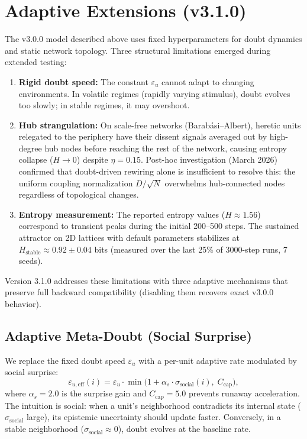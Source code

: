 \documentclass[11pt]{article}
\begin{document}
\section{Adaptive Extensions (v3.1.0)}
\label{sec:v4_extensions}

The v3.0.0 model described above uses fixed hyperparameters for doubt dynamics and static network topology. Three structural limitations emerged during extended testing:

\begin{enumerate}
    \item \textbf{Rigid doubt speed:} The constant $\varepsilon_u$ cannot adapt to changing environments. In volatile regimes (rapidly varying stimulus), doubt evolves too slowly; in stable regimes, it may overshoot.
    \item \textbf{Hub strangulation:} On scale-free networks (Barab\'asi--Albert), heretic units relegated to the periphery have their dissent signals averaged out by high-degree hub nodes before reaching the rest of the network, causing entropy collapse ($H \to 0$) despite $\eta = 0.15$. Post-hoc investigation (March 2026) confirmed that doubt-driven rewiring alone is insufficient to resolve this: the uniform coupling normalization $D/\sqrt{N}$ overwhelms hub-connected nodes regardless of topological changes.
    \item \textbf{Entropy measurement:} The reported entropy values ($H \approx 1.56$) correspond to transient peaks during the initial 200--500 steps. The sustained attractor on 2D lattices with default parameters stabilizes at $H_{\text{stable}} \approx 0.92 \pm 0.04$ bits (measured over the last 25\% of 3000-step runs, 7 seeds).
\end{enumerate}

Version 3.1.0 addresses these limitations with three adaptive mechanisms that preserve full backward compatibility (disabling them recovers exact v3.0.0 behavior).

\subsection{Adaptive Meta-Doubt (Social Surprise)}

We replace the fixed doubt speed $\varepsilon_u$ with a per-unit adaptive rate modulated by social surprise:
\begin{equation}
    \varepsilon_{u,\text{eff}}(i) = \varepsilon_u \cdot \min\!\bigl(1 + \alpha_s \cdot \sigma_{\text{social}}(i),\; C_{\text{cap}}\bigr),
    \label{eq:meta_doubt}
\end{equation}
where $\alpha_s = 2.0$ is the surprise gain and $C_{\text{cap}} = 5.0$ prevents runaway acceleration. The intuition is social: when a unit's neighborhood contradicts its internal state ($\sigma_{\text{social}}$ large), its epistemic uncertainty should update faster. Conversely, in a stable neighborhood ($\sigma_{\text{social}} \approx 0$), doubt evolves at the baseline rate.
\end{document}
